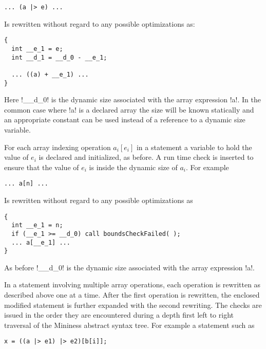 \singlespace
\begin{lstlisting}[language=nesC]
... (a |> e) ...
\end{lstlisting}
\primaryspacing

Is rewritten without regard to any possible optimizations as:

\singlespace
\begin{lstlisting}[language=nesC]
{
  int __e_1 = e;
  int __d_1 = __d_0 - __e_1;

  ... ((a) + __e_1) ...
}
\end{lstlisting}
\primaryspacing

Here !__d_0! is the dynamic size associated with the array expression !a!. In the common case
where !a! is a declared array the size will be known statically and an appropriate constant can
be used instead of a reference to a dynamic size variable.

For each array indexing operation $a_i[e_i]$ in a statement a variable to hold the value of
$e_i$ is declared and initialized, as before. A run time check is inserted to ensure that
the value of $e_i$ is inside the dynamic size of $a_i$. For example

\singlespace
\begin{lstlisting}[language=nesC]
... a[n] ...
\end{lstlisting}
\primaryspacing

Is rewritten without regard to any possible optimizations as

\singlespace
\begin{lstlisting}[language=nesC]
{
  int __e_1 = n;
  if (__e_1 >= __d_0) call boundsCheckFailed( );
  ... a[__e_1] ...
}
\end{lstlisting}
\primaryspacing

As before !__d_0! is the dynamic size associated with the array expression !a!.

In a statement involving multiple array operations, each operation is rewritten as described
above one at a time. After the first operation is rewritten, the enclosed modified statement is
further expanded with the second rewriting. The checks are issued in the order they are
encountered during a depth first left to right traversal of the Mininess abstract syntax tree.
For example a statement such as

\singlespace
\begin{lstlisting}[language=nesC]
x = ((a |> e1) |> e2)[b[i]];
\end{lstlisting}
\primaryspacing

